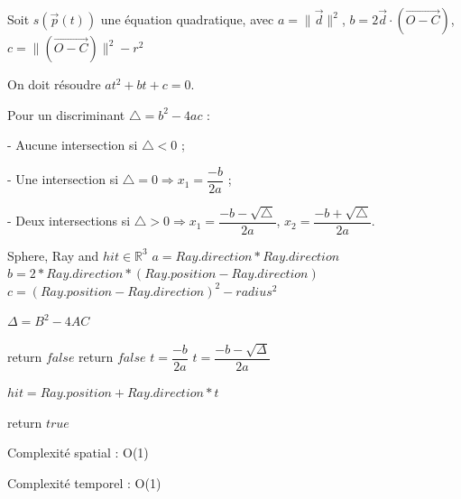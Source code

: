 Soit $s(\vec{p}(t))$ une équation quadratique, avec $a = \lVert \vec{d} \rVert^2$, $b = 2\vec{d}\cdot(\overrightarrow{O-C})$, $c = \lVert (\overrightarrow{O-C}) \rVert^2 - r^2$

On doit résoudre $at^2 + bt + c = 0$.

Pour un discriminant $\bigtriangleup = b^2 - 4ac$ : 

- Aucune intersection si $\bigtriangleup < 0$ ;

- Une intersection si $\bigtriangleup = 0 \Rightarrow x_1 = \dfrac{-b}{2a}$ ;

- Deux intersections si $\bigtriangleup > 0 \Rightarrow x_1 = \dfrac{-b - \sqrt{\bigtriangleup} }{2a}$, $x_2 = \dfrac{-b + \sqrt{\bigtriangleup} }{2a}$.

\begin{algorithm}
\caption{intersection Sphere}
\begin{algorithmic}
\Require Sphere, Ray and $hit \in \mathbb{R}^{3}$
\State $a = Ray.direction * Ray.direction$
\State $b = 2 * Ray.direction * (Ray.position - Ray.direction)$
\State $c = (Ray.position - Ray.direction)^2 - radius^2$

$\Delta = B^2 - 4AC$  

   \State return $false$
    \State return $false$
    \State $t = \dfrac{-b}{2a}$
    \State $t = \dfrac{-b - \sqrt{\Delta}}{2a}$
\EndIf

\State $hit = Ray.position + Ray.direction * t$

\State return $true$

\end{algorithmic}
Complexité spatial : O(1)

Complexité temporel : O(1)
\end{algorithm}

\pagebreak
